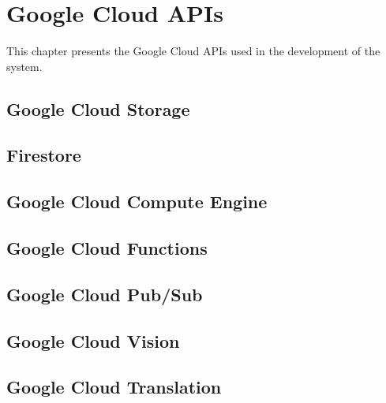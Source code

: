 \chapter{Google Cloud APIs}\label{ch:google_cloud_apis}

This chapter presents the Google Cloud APIs used in the development of the system.

\section{Google Cloud Storage}\label{sec:google_cloud_storage}

\section{Firestore}\label{sec:firestore}

\section{Google Cloud Compute Engine}\label{sec:google_cloud_compute_engine}

\section{Google Cloud Functions}\label{sec:google_cloud_functions}

\section{Google Cloud Pub/Sub}\label{sec:google_cloud_pub_sub}

\section{Google Cloud Vision}\label{sec:google_cloud_vision}

\section{Google Cloud Translation}\label{sec:google_cloud_translation}
